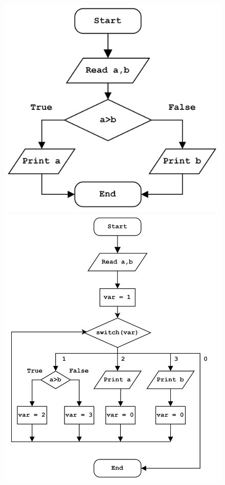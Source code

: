 \documentclass[
  digital, %
  table,   %
  twoside, %
  nolof,     %
  nolot,     %
]{fithesis3}
\theoremstyle{definition}
\begin{document}
\begin{figure}
    \begin{center}
        \begin{minipage}{.39\textwidth}
             \includegraphics[width=\textwidth]{notflat.png}
        \end{minipage}
        \begin{minipage}{.6\textwidth}
             \includegraphics[width=\textwidth]{flat.png}

\end{minipage}
\end{center}
\end{figure}
\end{document}
